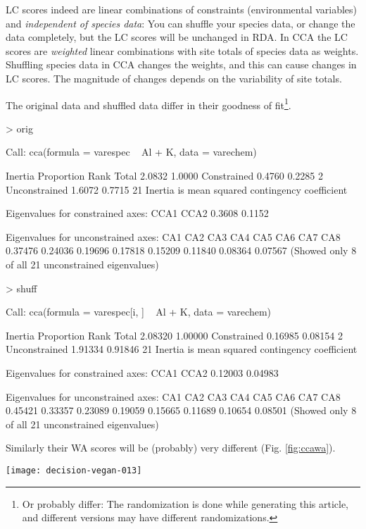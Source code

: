 \documentclass[a4paper,10pt]{amsart}
\begin{document}
LC scores indeed are linear combinations of constraints (environmental
variables) and \emph{independent of species data}: You can
shuffle your species data, or change the data completely, but the LC
scores will be unchanged in RDA.  In CCA the LC scores are
\emph{weighted} linear combinations with site totals of species data
as weights. Shuffling species data in CCA changes the weights, and
this can cause changes in LC scores.  The magnitude of changes depends
on the variability of site totals.

The original data and shuffled data differ in their goodness of
fit\footnote{Or probably differ: The randomization is done while
generating this article, and different versions may have different
randomizations.}.
\begin{Schunk}
\begin{Sinput}
> orig
\end{Sinput}
\begin{Soutput}
Call: cca(formula = varespec ~ Al + K, data = varechem)

              Inertia Proportion Rank
Total          2.0832     1.0000     
Constrained    0.4760     0.2285    2
Unconstrained  1.6072     0.7715   21
Inertia is mean squared contingency coefficient 

Eigenvalues for constrained axes:
  CCA1   CCA2 
0.3608 0.1152 

Eigenvalues for unconstrained axes:
    CA1     CA2     CA3     CA4     CA5     CA6     CA7     CA8 
0.37476 0.24036 0.19696 0.17818 0.15209 0.11840 0.08364 0.07567 
(Showed only 8 of all 21 unconstrained eigenvalues)
\end{Soutput}
\begin{Sinput}
> shuff
\end{Sinput}
\begin{Soutput}
Call: cca(formula = varespec[i, ] ~ Al + K, data = varechem)

              Inertia Proportion Rank
Total         2.08320    1.00000     
Constrained   0.16985    0.08154    2
Unconstrained 1.91334    0.91846   21
Inertia is mean squared contingency coefficient 

Eigenvalues for constrained axes:
   CCA1    CCA2 
0.12003 0.04983 

Eigenvalues for unconstrained axes:
    CA1     CA2     CA3     CA4     CA5     CA6     CA7     CA8 
0.45421 0.33357 0.23089 0.19059 0.15665 0.11689 0.10654 0.08501 
(Showed only 8 of all 21 unconstrained eigenvalues)
\end{Soutput}
\end{Schunk}
Similarly their WA scores will be (probably) very different
(Fig. \ref{fig:ccawa}).
\begin{SCfigure}
\texttt{[image: decision-vegan-013]}
\caption{Procrustes rotation of WA scores of CCA with the original and
  shuffled data.}
\label{fig:ccawa}
\end{SCfigure}
\end{document}
